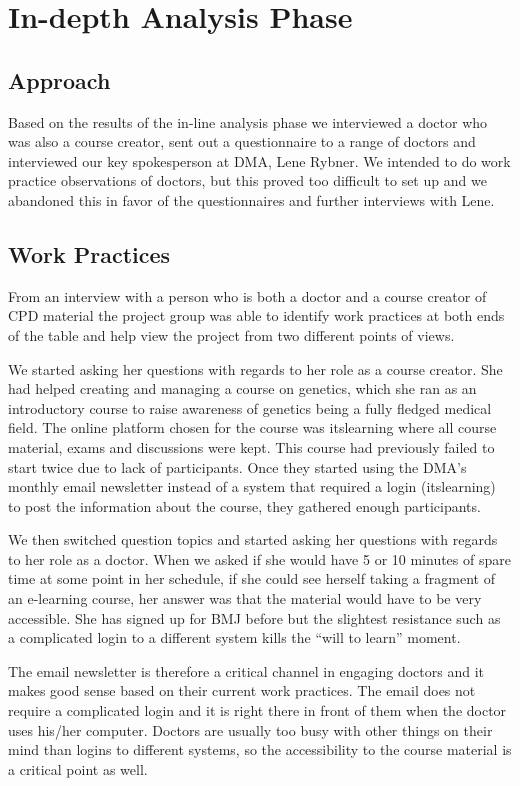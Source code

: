 \section{In-depth Analysis Phase}
\subsection{Approach}
Based on the results of the in-line analysis phase we interviewed a doctor who was also a course creator, sent out a questionnaire to a range of doctors and interviewed our key spokesperson at DMA, Lene Rybner. We intended to do work practice observations of doctors, but this proved too difficult to set up and we abandoned this in favor of the questionnaires and further interviews with Lene.

\subsection{Work Practices}
From an interview with a person who is both a doctor and a course creator of CPD material the project group was able to identify work practices at both ends of the table and help view the project from two different points of views.

We started asking her questions with regards to her role as a course creator. She had helped creating and managing a course on genetics, which she ran as an introductory course to raise awareness of genetics being a fully fledged medical field. The online platform chosen for the course was itslearning where all course material, exams and discussions were kept. This course had previously failed to start twice due to lack of participants.
Once they started using the DMA’s monthly email newsletter instead of a system that required a login (itslearning) to post the information about the course, they gathered enough participants.

We then switched question topics and started asking her questions with regards to her role as a doctor. When we asked if she would have 5 or 10 minutes of spare time at some point in her schedule, if she could see herself taking a fragment of an e-learning course, her answer was that the material would have to be very accessible. She has signed up for BMJ before but the slightest resistance such as a complicated login to a different system kills the “will to learn” moment.

The email newsletter is therefore a critical channel in engaging doctors and it makes good sense based on their current work practices. The email does not require a complicated login and it is right there in front of them when the doctor uses his/her computer. Doctors are usually too busy with other things on their mind than logins to different systems, so the accessibility to the course material is a critical point as well.

